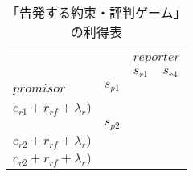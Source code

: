 \newcommand{\SROSinAcc}{ $(c_{p1} + r_{ps} + \epsilon_p,$ \\$ c_{r1} + r_{rs} + \epsilon_r)$ }
\newcommand{\FROSinAcc}{ $(c_{p1} + r_{pf} + \lambda_p,$ \\ $ c_{r1} + r_{rf} + \lambda_r)$ }
\newcommand{\FROFinAcc}{ $(c_{p2} + r_{pf} + \lambda_p,$ \\ $ c_{r2} + r_{rf} + \lambda_r)$ }

\begin{table*}
  \centering
  \begin{tabular}{|l|l|l|l|}
    \hline
    \multicolumn{2}{|l|}{\multirow{2}{*}{}} & \multicolumn{2}{l|}{$reporter$} \\ \cline{3-4}
    \multicolumn{2}{|l|}{}                  &$s_{r1}$                &$s_{r4}$\\ \hline
    \multirow{2}{*}{$promisor$}
    &$s_{p1}$&\tabularc{\SROSinAcc}&\tabularc{\FROSinAcc}\\ \cline{2-4}
    &$s_{p2}$&\tabularc{\FROFinAcc}&\tabularc{\FROFinAcc}\\ \hline
  \end{tabular}
  \caption{「告発する約束・評判ゲーム」の利得表}
  \label{ethical-gametable}
\end{table*}